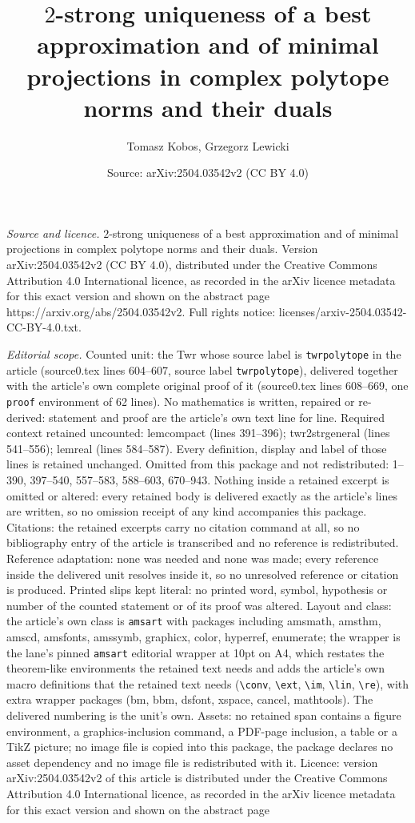 \documentclass[10pt,a4paper]{amsart}
\title[$2$-strong uniqueness of a best approximation and of minimal]{$2$-strong uniqueness of a best approximation and of minimal projections in complex polytope norms and their duals}
\author{Tomasz Kobos, Grzegorz Lewicki}
\date{Source: arXiv:2504.03542v2 (CC BY 4.0)}
\begin{document}
\maketitle

\noindent\emph{Source and licence.} $2$-strong uniqueness of a best approximation and of minimal projections in complex polytope norms and their duals. Version arXiv:2504.03542v2 (CC BY 4.0), distributed under the Creative Commons Attribution 4.0 International licence, as recorded in the arXiv licence metadata for this exact version and shown on the abstract page https://arxiv.org/abs/2504.03542v2. Full rights notice: licenses/arxiv-2504.03542-CC-BY-4.0.txt.\par\smallskip

\noindent\textit{Editorial scope.} Counted unit: the Twr whose source label is \texttt{twrpolytope} in the article (source0.tex lines 604--607, source label \texttt{twrpolytope}), delivered together with the article's own complete original proof of it (source0.tex lines 608--669, one \texttt{proof} environment of 62 lines). No mathematics is written, repaired or re-derived: statement and proof are the article's own text line for line. Required context retained uncounted: lemcompact (lines 391--396); twr2strgeneral (lines 541--556); lemreal (lines 584--587). Every definition, display and label of those lines is retained unchanged. Omitted from this package and not redistributed: 1--390, 397--540, 557--583, 588--603, 670--943. Nothing inside a retained excerpt is omitted or altered: every retained body is delivered exactly as the article's lines are written, so no omission receipt of any kind accompanies this package. Citations: the retained excerpts carry no citation command at all, so no bibliography entry of the article is transcribed and no reference is redistributed. Reference adaptation: none was needed and none was made; every reference inside the delivered unit resolves inside it, so no unresolved reference or citation is produced. Printed slips kept literal: no printed word, symbol, hypothesis or number of the counted statement or of its proof was altered. Layout and class: the article's own class is \texttt{amsart} with packages including amsmath, amsthm, amscd, amsfonts, amssymb, graphicx, color, hyperref, enumerate; the wrapper is the lane's pinned \texttt{amsart} editorial wrapper at 10pt on A4, which restates the theorem-like environments the retained text needs and adds the article's own macro definitions that the retained text needs (\texttt{\textbackslash conv}, \texttt{\textbackslash ext}, \texttt{\textbackslash im}, \texttt{\textbackslash lin}, \texttt{\textbackslash re}), with extra wrapper packages (bm, bbm, dsfont, xspace, cancel, mathtools). The delivered numbering is the unit's own. Assets: no retained span contains a figure environment, a graphics-inclusion command, a PDF-page inclusion, a table or a TikZ picture; no image file is copied into this package, the package declares no asset dependency and no image file is redistributed with it. Licence: version arXiv:2504.03542v2 of this article is distributed under the Creative Commons Attribution 4.0 International licence, as recorded in the arXiv licence metadata for this exact version and shown on the abstract page 
\end{document}
